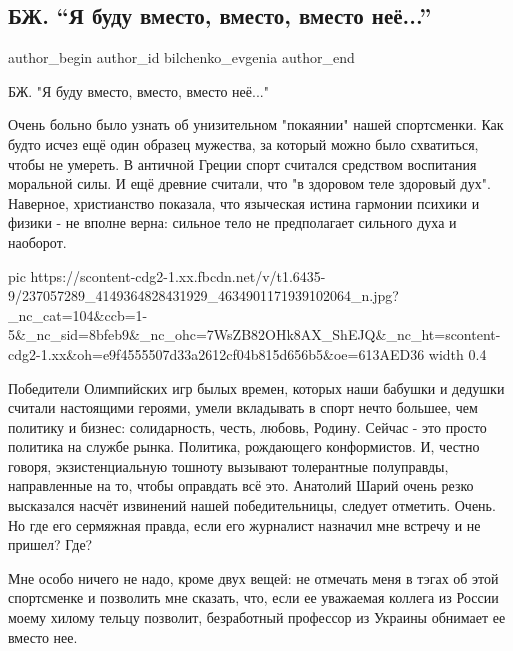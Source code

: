  
 
 
 
 
 
\subsection{БЖ. \enquote{Я буду вместо, вместо, вместо неё...}}
\label{sec:13_08_2021.fb.bilchenko_evgenia.1.maguchih}
 
\ifcmt
 author_begin
   author_id bilchenko_evgenia
 author_end
\fi

БЖ. "Я буду вместо, вместо, вместо неё..."

Очень больно было узнать об унизительном "покаянии" нашей спортсменки. Как
будто исчез ещё один образец мужества, за который можно было схватиться, чтобы
не умереть. В античной Греции спорт считался средством воспитания моральной
силы. И ещё древние считали, что "в здоровом теле здоровый дух". Наверное,
христианство показала, что языческая истина гармонии психики и физики - не
вполне верна: сильное тело не предполагает сильного духа и наоборот. 

\ifcmt
  pic https://scontent-cdg2-1.xx.fbcdn.net/v/t1.6435-9/237057289_4149364828431929_4634901171939102064_n.jpg?_nc_cat=104&ccb=1-5&_nc_sid=8bfeb9&_nc_ohc=7WsZB82OHk8AX_ShEJQ&_nc_ht=scontent-cdg2-1.xx&oh=e9f4555507d33a2612cf04b815d656b5&oe=613AED36
  width 0.4
\fi

Победители Олимпийских игр былых времен, которых наши бабушки и дедушки считали
настоящими героями, умели вкладывать в спорт нечто большее, чем политику и
бизнес: солидарность, честь, любовь, Родину. Сейчас - это просто политика на
службе рынка. Политика, рождающего конформистов. И, честно говоря,
экзистенциальную тошноту вызывают толерантные полуправды, направленные на то,
чтобы оправдать всё это. Анатолий Шарий очень резко высказался насчёт извинений
нашей победительницы, следует отметить. Очень. Но где его сермяжная правда,
если его журналист назначил мне встречу и не пришел? Где?

Мне особо ничего не надо, кроме двух вещей: не отмечать меня в тэгах об этой
спортсменке и позволить мне сказать, что, если ее уважаемая коллега из России
моему хилому тельцу позволит, безработный профессор из Украины обнимает ее
вместо нее.

